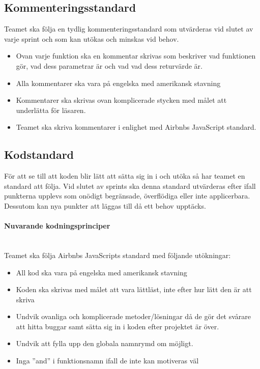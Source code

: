 \documentclass[10pt]{article}
\begin{document}
	
	\subsection{Kommenteringsstandard}
	Teamet ska följa en tydlig kommenteringsstandard som utvärderas vid slutet av varje sprint och som kan utökas och minskas vid behov.
	
	\begin{itemize}
		\item 	Ovan varje funktion ska en kommentar skrivas som beskriver vad funktionen gör, vad dess parametrar är och vad vad dess returvärde är.
		\item Alla kommentarer ska vara på engelska med amerikansk stavning
		\item Kommentarer ska skrivas ovan komplicerade stycken med målet att underlätta för läsaren.
		\item Teamet ska skriva kommentarer i enlighet med Airbnbs JavaScript standard.
	\end{itemize}

	
	\subsection{Kodstandard}
	För att se till att koden blir lätt att sätta sig in i och utöka så har teamet en standard att följa. Vid slutet av sprints ska denna standard utvärderas efter ifall punkterna upplevs som onödigt begränsade, överflödiga eller inte applicerbara. Dessutom kan nya punkter att läggas till då ett behov upptäcks.

	\paragraph{Nuvarande kodningsprinciper} \mbox{}
	\\
	Teamet ska följa Airbnbs JavaScripts standard med följande utökningar:
	\begin{itemize}
	\item All kod ska vara på engelska med amerikansk stavning
	\item Koden ska skrivas med målet att vara lättläst, inte efter hur lätt den är att skriva
	\item Undvik ovanliga och komplicerade metoder/lösningar då de gör det svårare att hitta buggar samt sätta sig in i koden efter projektet är över.
	\item Undvik att fylla upp den globala namnrymd om möjligt.
	\item Inga  ''and'' i funktionsnamn ifall de inte kan motiveras väl
	
	\end{itemize}
	
\end{document}
